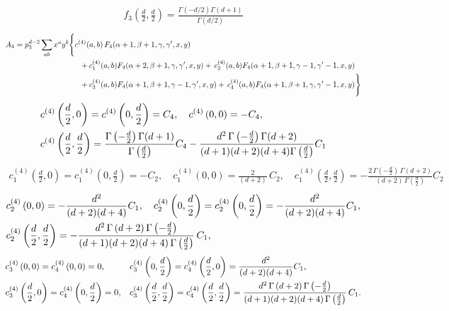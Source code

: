 \documentclass[a4paper,11pt,openright,twoside]{book}
\let\a=\alpha   \let\b=\beta   \let\g=\gamma   \let\d=\delta
\numberwithin{equation}{section}
\begin{document}
{{\begin{align}
f_3\left(\frac{d}{2},\frac{d}{2}\right)=\frac{\Gamma(-d/2)\Gamma(d+1)}{\Gamma(d/2)}
\end{align} 
\begin{align}
A_4&=p_3^{d-2}\sum_{ab}x^ay^b\Bigg\{c^{(4)}(a,b)\,F_4(\a+1,\b+1,\g,\g',x,y)\notag\\
&\hspace{3cm}+c^{(4)}_1(a,b)F_4(\a+2,\b+1,\g,\g',x,y)+\,c^{(4)}_2(a,b)F_4(\a+1,\b+1,\g-1,\g'-1,x,y)\notag\\
&\hspace{3cm}+c^{(4)}_3(a,b)F_4(\a+1,\b+1,\g-1,\g',x,y)+\,c^{(4)}_4(a,b)F_4(\a+1,\b+1,\g,\g'-1,x,y)\Bigg\}
\end{align}
\begin{align}
&c^{(4)}\left(\frac{d}{2},0\right)=c^{(4)}\left(0,\frac{d}{2}\right)=C_4,\quad
c^{(4)}\left(0,0\right)=-C_4,\notag\\
&c^{(4)}\left(\frac{d}{2},\frac{d}{2}\right)=\frac{\Gamma\left(-\frac{d}{2}\right)\Gamma(d+1)}{\Gamma\left(\frac{d}{2}\right)}C_4-\frac{d^2\,\Gamma\left(-\frac{d}{2}\right)\Gamma(d+2)}{(d+1)(d+2)(d+4)\Gamma\left(\frac{d}{2}\right)}C_1
\end{align}
\begin{align}
c_1^{(4)}\left(\frac{d}{2},0\right)=c^{(4)}_1\left(0,\frac{d}{2}\right)=-C_2,\quad
c_1^{(4)}\left(0,0\right)=\frac{2}{(d+2)}\,C_2,\quad c_1^{(4)}\left(\frac{d}{2},\frac{d}{2}\right)=-\frac{2\,\Gamma\left(-\frac{d}{2}\right)\,\Gamma\left(d+2\right)}{(d+2)\,\Gamma\left(\frac{d}{2}\right)}C_2
\end{align}
\begin{align}
&c_2^{(4)}\left(0,0\right)=-\frac{d^2}{(d+2)(d+4)}C_1,\quad
c_2^{(4)}\left(0,\frac{d}{2}\right)=c_2^{(4)}\left(0,\frac{d}{2}\right)=-\frac{d^2}{(d+2)(d+4)}C_1,\notag\\
&c_2^{(4)}\left(\frac{d}{2},\frac{d}{2}\right)=-\frac{d^2\,\Gamma\left(d+2\right)\Gamma\left(-\frac{d}{2}\right)}{(d+1)(d+2)(d+4)\,\Gamma\left(\frac{d}{2}\right)}\,C_1,
\end{align}
\begin{align}
&c_3^{(4)}\left(0,0\right)=c_4^{(4)}\left(0,0\right)=0,&&	c_3^{(4)}\left(0,\frac{d}{2}\right)=c_4^{(4)}\left(\frac{d}{2},0\right)=\frac{d^2}{(d+2)(d+4)}C_1,\notag\\
&c_3^{(4)}\left(\frac{d}{2},0\right)=c_4^{(4)}\left(0,\frac{d}{2}\right)=0,&&
c_3^{(4)}\left(\frac{d}{2},\frac{d}{2}\right)=c_4^{(4)}\left(\frac{d}{2},\frac{d}{2}\right)=\frac{d^2\,\Gamma\left(d+2\right)\Gamma\left(-\frac{d}{2}\right)}{(d+1)(d+2)(d+4)\,\Gamma\left(\frac{d}{2}\right)}\,C_1.

\end{align}}}
\end{document}
